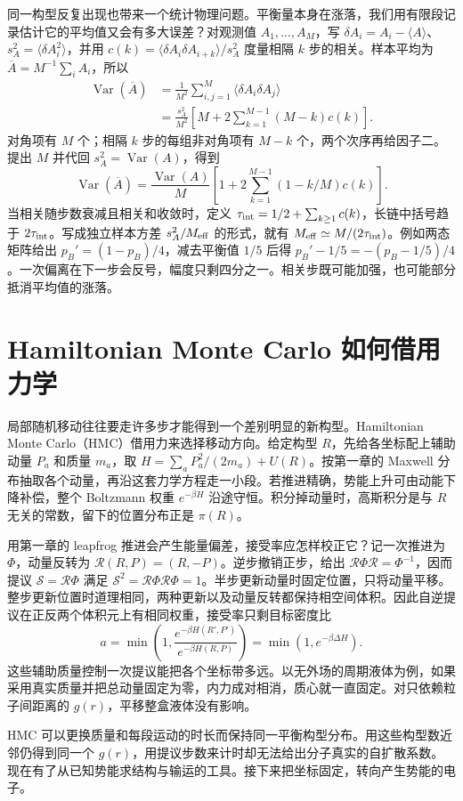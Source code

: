 同一构型反复出现也带来一个统计物理问题。平衡量本身在涨落，我们用有限段记录估计它的平均值又会有多大误差？对观测值 $A_1,\ldots,A_M$，写 $\delta A_i=A_i-\langle A\rangle$、$s_A^2=\langle\delta A_i^2\rangle$，并用 $c(k)=\langle\delta A_i\delta A_{i+k}\rangle/s_A^2$ 度量相隔 $k$ 步的相关。样本平均为 $\overline A=M^{-1}\sum_iA_i$，所以
\begin{align}
\operatorname{Var}(\overline A)
&=\frac1{M^2}\sum_{i,j=1}^M\langle\delta A_i\delta A_j\rangle\\
&=\frac{s_A^2}{M^2}\left[M+2\sum_{k=1}^{M-1}(M-k)c(k)\right].
\end{align}
对角项有 $M$ 个；相隔 $k$ 步的每组非对角项有 $M-k$ 个，两个次序再给因子二。提出 $M$ 并代回 $s_A^2=\operatorname{Var}(A)$，得到
\begin{equation}
\operatorname{Var}(\overline A)=\frac{\operatorname{Var}(A)}M
\left[1+2\sum_{k=1}^{M-1}(1-k/M)c(k)\right].
\end{equation}
当相关随步数衰减且相关和收敛时，定义 $\tau_{\rm int}=1/2+\sum_{k\ge1}c(k)$，长链中括号趋于 $2\tau_{\rm int}$。写成独立样本方差 $s_A^2/M_{\rm eff}$ 的形式，就有 $M_{\rm eff}\simeq M/(2\tau_{\rm int})$。例如两态矩阵给出 $p_B'=(1-p_B)/4$，减去平衡值 $1/5$ 后得 $p_B'-1/5=-(p_B-1/5)/4$。一次偏离在下一步会反号，幅度只剩四分之一。相关步既可能加强，也可能部分抵消平均值的涨落。

\section{Hamiltonian Monte Carlo 如何借用力学}
局部随机移动往往要走许多步才能得到一个差别明显的新构型。Hamiltonian Monte Carlo（HMC）借用力来选择移动方向。给定构型 $R$，先给各坐标配上辅助动量 $P_a$ 和质量 $m_a$，取 $H=\sum_aP_a^2/(2m_a)+U(R)$。按第一章的 Maxwell 分布抽取各个动量，再沿这套力学方程走一小段。若推进精确，势能上升可由动能下降补偿，整个 Boltzmann 权重 $e^{-\beta H}$ 沿途守恒。积分掉动量时，高斯积分是与 $R$ 无关的常数，留下的位置分布正是 $\pi(R)$。

用第一章的 leapfrog 推进会产生能量偏差，接受率应怎样校正它？记一次推进为 $\Phi$，动量反转为 $\mathcal R(R,P)=(R,-P)$。逆步撤销正步，给出 $\mathcal R\Phi\mathcal R=\Phi^{-1}$，因而提议 $\mathcal S=\mathcal R\Phi$ 满足 $\mathcal S^2=\mathcal R\Phi\mathcal R\Phi=1$。半步更新动量时固定位置，只将动量平移。整步更新位置时道理相同，两种更新以及动量反转都保持相空间体积。因此自逆提议在正反两个体积元上有相同权重，接受率只剩目标密度比
\begin{equation}
a=\min\left(1,\frac{e^{-\beta H(R',P')}}{e^{-\beta H(R,P)}}\right)
=\min(1,e^{-\beta\Delta H}).
\end{equation}
这些辅助质量控制一次提议能把各个坐标带多远。以无外场的周期液体为例，如果采用真实质量并把总动量固定为零，内力成对相消，质心就一直固定。对只依赖粒子间距离的 $g(r)$，平移整盒液体没有影响。

HMC 可以更换质量和每段运动的时长而保持同一平衡构型分布。用这些构型数近邻仍得到同一个 $g(r)$，用提议步数来计时却无法给出分子真实的自扩散系数。现在有了从已知势能求结构与输运的工具。接下来把坐标固定，转向产生势能的电子。
